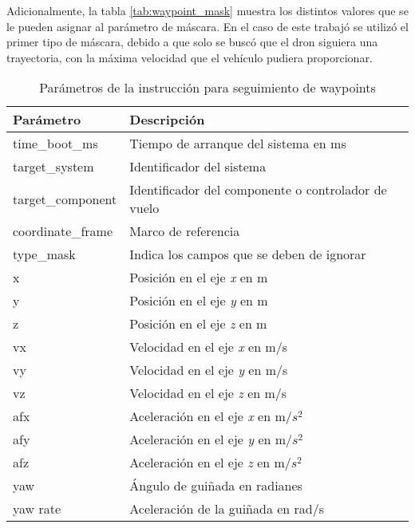 Adicionalmente, la tabla \ref{tab:waypoint_mask} muestra los distintos valores que se le pueden asignar al parámetro de máscara. En el caso de este trabajó se utilizó el primer tipo de máscara, debido a que solo se buscó que el dron siguiera una trayectoria, con la máxima velocidad que el vehículo pudiera proporcionar.

\begin{table}[ht]
    \centering
    \begin{tabular}{ll}
        \hline
        Parámetro & Descripción\\
        \hline
        \hline
        time\_boot\_ms & Tiempo de arranque del sistema en ms\\
        target\_system & Identificador del sistema\\
        target\_component & Identificador del componente o controlador de vuelo\\
        coordinate\_frame & Marco de referencia\\
        type\_mask & Indica los campos que se deben de ignorar\\
        x & Posición en el eje \textit{x} en m\\
        y & Posición en el eje \textit{y} en m\\
        z & Posición en el eje \textit{z} en m\\
        vx & Velocidad en el eje \textit{x} en m/s\\
        vy & Velocidad en el eje \textit{y} en m/s\\
        vz & Velocidad en el eje \textit{z} en m/s\\
        afx & Aceleración en el eje \textit{x} en m/$s^2$\\
        afy & Aceleración en el eje \textit{y} en m/$s^2$\\
        afz & Aceleración en el eje \textit{z} en m/$s^2$\\
        yaw & Ángulo de guiñada en radianes\\
        yaw rate & Aceleración de la guiñada en rad/s\\
        \hline
        \hline
    \end{tabular}
    \caption{Parámetros de la instrucción para seguimiento de waypoints}
    \label{tab:waypoint}
\end{table}


